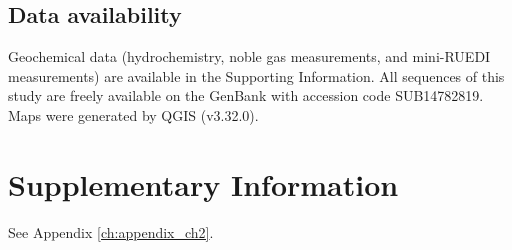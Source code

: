 \subsection{Data availability}
Geochemical data (hydrochemistry, noble gas measurements, and mini-RUEDI measurements) are available in the Supporting Information.
All sequences of this study are freely available on the GenBank with accession code SUB14782819.
Maps were generated by QGIS (v3.32.0).

\section{Supplementary Information}
See Appendix \ref{ch:appendix_ch2}.